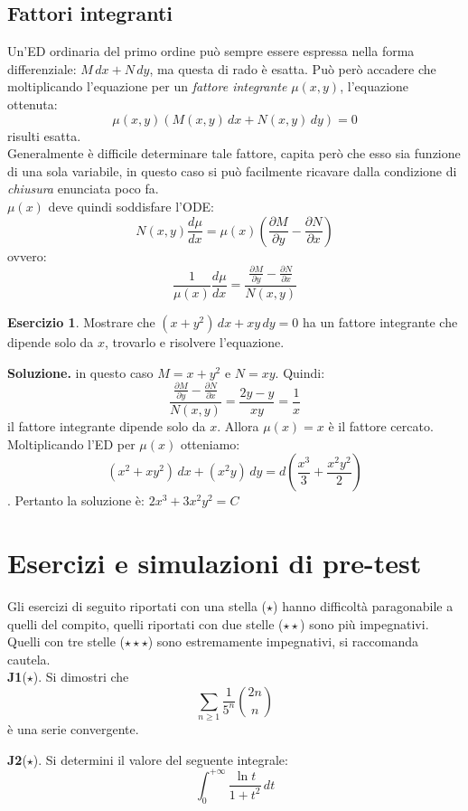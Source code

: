 \documentclass[a4paper,twoside]{article}
\theoremstyle{definition}
\newtheorem{ex}[theorem]{Esercizio}
\numberwithin{theorem}{section}
\begin{document}
\subsection{Fattori integranti}
Un'ED ordinaria del primo ordine può sempre essere espressa nella forma differenziale: $M\,dx + N\,dy$, ma questa di rado è esatta. Può però accadere che moltiplicando l'equazione per un \emph{fattore integrante} $\mu(x,y)$, l'equazione ottenuta: $$\mu(x,y)(M(x,y)\,dx +N(x,y)\,dy)=0$$ risulti esatta. \\
Generalmente è difficile determinare tale fattore, capita però che esso sia funzione di una sola variabile, in questo caso si può facilmente ricavare dalla condizione di \emph{chiusura} enunciata poco fa. \\
$\mu(x)$ deve quindi soddisfare l'ODE:
$$N(x,y)\frac{d\mu}{dx}=\mu(x)(\frac{\partial M}{\partial y}-\frac{\partial N}{\partial x})$$
ovvero:
$$\frac{1}{\mu(x)}\frac{d\mu}{dx}=\frac{\frac{\partial M}{\partial y}-\frac{\partial N}{\partial x}}{N(x,y)}$$
\begin{ex}
    Mostrare che $(x+y^2)\,dx + xy\,dy=0$ ha un fattore integrante che dipende solo da $x$, trovarlo e risolvere l'equazione.
\end{ex}
\textbf{Soluzione.} in questo caso $M=x+y^2$ e $N=xy$. Quindi:
$$ \frac{\frac{\partial M}{\partial y}-\frac{\partial N}{\partial x}}{N(x,y)}=\frac{2y-y}{xy}=\frac{1}{x}$$ 
il fattore integrante dipende solo da $x$. Allora $\mu(x)=x$ è il fattore cercato. Moltiplicando l'ED per $\mu(x)$ otteniamo:
$$(x^2+xy^2)\,dx + (x^2y)\,dy= d(\frac{x^3}{3}+\frac{x^2y^2}{2})$$.
Pertanto la soluzione è: $2x^3+3x^2y^2=C$
\section{Esercizi e simulazioni di pre-test}
Gli esercizi di seguito riportati con una stella ($\star$) hanno difficoltà paragonabile a quelli del compito, quelli riportati con due stelle ($\star\star$) sono più impegnativi. Quelli con tre stelle ($\star\star\star$) sono estremamente impegnativi, si raccomanda cautela.\\


 \textbf{J1}($\star$). Si dimostri che 
\begin{equation*}
 \sum_{n\geq 1}\frac{1}{5^n}\binom{2n}{n}   
\end{equation*}
è una serie convergente.


\textbf{J2}($\star$). Si determini il valore del seguente integrale: 
\begin{equation*}
 \int_{0}^{+\infty}\frac{\ln t}{1+t^2}\,dt   
\end{equation*}
\end{document}
